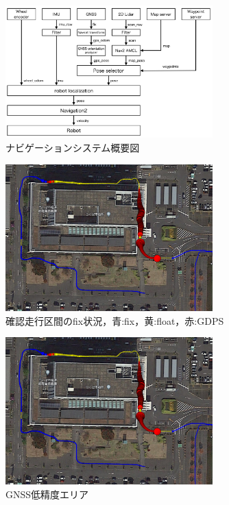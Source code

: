 \documentclass[platex,dvipdfmx]{rbproceedings}
\begin{document}
\begin{figure}[htbp]
    \centering   
    \includegraphics[keepaspectratio,width=80mm]{fig/system.png}
    \caption{ナビゲーションシステム概要図}
    \label{fig:system}
\end{figure}

\begin{figure}[htbp]
    \centering   
    \includegraphics[keepaspectratio,width=80mm]{fig/cityhall_fix.png}
    \caption{確認走行区間のfix状況，青:fix，黄:float，赤:GDPS}
    \label{fig:cityhall_fix}
\end{figure}

\begin{figure}[htbp]
    \centering   
    \includegraphics[keepaspectratio,width=80mm]{fig/cityhall_fix.png}
    \caption{GNSS低精度エリア}
    \label{fig:no_gnss_area}
\end{figure}
\end{document}
